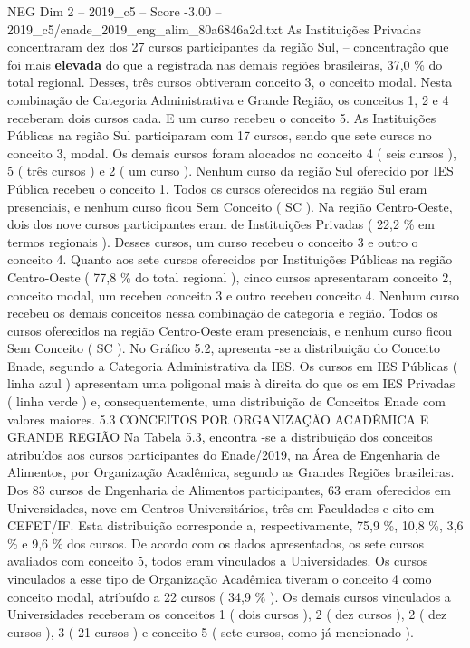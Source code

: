 \begin{textsample}{NEG Dim 2 – 2019\_c5 – Score -3.00 – 2019\_c5/enade\_2019\_eng\_alim\_80a6846a2d.txt}
As Instituições Privadas concentraram dez dos 27 cursos participantes da região Sul, – concentração que foi mais \textbf{elevada} do que a registrada nas demais regiões brasileiras, 37,0 \% do total regional.
Desses, três cursos obtiveram conceito 3, o conceito modal.
Nesta combinação de Categoria Administrativa e Grande Região, os conceitos 1, 2 e 4 receberam dois cursos cada.
E um curso recebeu o conceito 5.
As Instituições Públicas na região Sul participaram com 17 cursos, sendo que sete cursos no conceito 3, modal.
Os demais cursos foram alocados no conceito 4 ( seis cursos ), 5 ( três cursos ) e 2 ( um curso ).
Nenhum curso da região Sul oferecido por IES Pública recebeu o conceito 1.
Todos os cursos oferecidos na região Sul eram presenciais, e nenhum curso ficou Sem Conceito ( SC ).
Na região Centro-Oeste, dois dos nove cursos participantes eram de Instituições Privadas ( 22,2 \% em termos regionais ).
Desses cursos, um curso recebeu o conceito 3 e outro o conceito 4.
Quanto aos sete cursos oferecidos por Instituições Públicas na região Centro-Oeste ( 77,8 \% do total regional ), cinco cursos apresentaram conceito 2, conceito modal, um recebeu conceito 3 e outro recebeu conceito 4.
Nenhum curso recebeu os demais conceitos nessa combinação de categoria e região.
Todos os cursos oferecidos na região Centro-Oeste eram presenciais, e nenhum curso ficou Sem Conceito ( SC ).
No Gráfico 5.2, apresenta -se a distribuição do Conceito Enade, segundo a Categoria Administrativa da IES.
Os cursos em IES Públicas ( linha azul ) apresentam uma poligonal mais à direita do que os em IES Privadas ( linha verde ) e, consequentemente, uma distribuição de Conceitos Enade com valores maiores. 5.3 CONCEITOS POR ORGANIZAÇÃO ACADÊMICA E GRANDE REGIÃO Na Tabela 5.3, encontra -se a distribuição dos conceitos atribuídos aos cursos participantes do Enade/2019, na Área de Engenharia de Alimentos, por Organização Acadêmica, segundo as Grandes Regiões brasileiras.
Dos 83 cursos de Engenharia de Alimentos participantes, 63 eram oferecidos em Universidades, nove em Centros Universitários, três em Faculdades e oito em CEFET/IF.
Esta distribuição corresponde a, respectivamente, 75,9 \%, 10,8 \%, 3,6 \% e 9,6 \% dos cursos.
De acordo com os dados apresentados, os sete cursos avaliados com conceito 5, todos eram vinculados a Universidades.
Os cursos vinculados a esse tipo de Organização Acadêmica tiveram o conceito 4 como conceito modal, atribuído a 22 cursos ( 34,9 \% ).
Os demais cursos vinculados a Universidades receberam os conceitos 1 ( dois cursos ), 2 ( dez cursos ), 2 ( dez cursos ), 3 ( 21 cursos ) e conceito 5 ( sete cursos, como já mencionado ).

\end{textsample}
